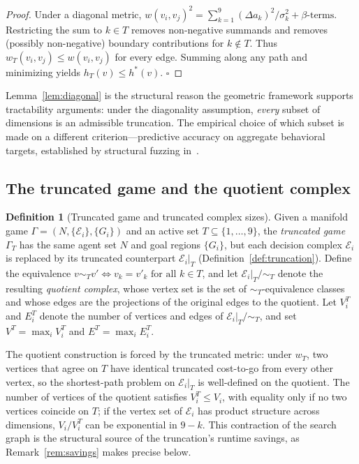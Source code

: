 \documentclass[11pt]{article}
\theoremstyle{definition}
\newtheorem{definition}[theorem]{Definition}
\theoremstyle{remark}
\newcommand{\E}{\mathcal{E}}
\begin{document}
\begin{proof}
Under a diagonal metric, $w(v_i, v_j)^2 = \sum_{k=1}^{9} (\Delta a_k)^2/\sigma_k^2 + \beta\text{-terms}$.
Restricting the sum to $k \in T$ removes non-negative summands and removes (possibly non-negative)
boundary contributions for $k \notin T$. Thus $w_T(v_i, v_j) \leq w(v_i, v_j)$ for every edge.
Summing along any path and minimizing yields $h_T(v) \leq h^*(v)$. $\square$
\end{proof}

Lemma~\ref{lem:diagonal} is the structural reason the geometric framework supports tractability
arguments: under the diagonality assumption, \emph{every} subset of dimensions is an admissible
truncation. The empirical choice of which subset is made on a different criterion---predictive
accuracy on aggregate behavioral targets, established by structural fuzzing in~\cite{bond2026tcss}.

\subsection{The truncated game and the quotient complex}

\begin{definition}[Truncated game and truncated complex sizes]
\label{def:truncated-game}
Given a manifold game $\Gamma = (N, \{\E_i\}, \{G_i\})$ and an active set $T \subseteq \{1,\ldots,9\}$,
the \emph{truncated game} $\Gamma_T$ has the same agent set $N$ and goal regions $\{G_i\}$, but each
decision complex $\E_i$ is replaced by its truncated counterpart $\E_i|_T$ (Definition~\ref{def:truncation}).
Define the equivalence $v \sim_T v' \iff v_k = v'_k \text{ for all } k \in T$, and let
$\E_i|_T / \sim_T$ denote the resulting \emph{quotient complex}, whose vertex set is the set of
$\sim_T$-equivalence classes and whose edges are the projections of the original edges to the quotient.
Let $V_i^T$ and $E_i^T$ denote the number of vertices and edges of $\E_i|_T / \sim_T$, and set
$V^T = \max_i V_i^T$ and $E^T = \max_i E_i^T$.
\end{definition}

The quotient construction is forced by the truncated metric: under $w_T$, two vertices that agree on
$T$ have identical truncated cost-to-go from every other vertex, so the shortest-path problem on
$\E_i|_T$ is well-defined on the quotient. The number of vertices of the quotient satisfies $V_i^T
\leq V_i$, with equality only if no two vertices coincide on $T$; if the vertex set of $\E_i$ has
product structure across dimensions, $V_i / V_i^T$ can be exponential in $9 - k$. This contraction
of the search graph is the structural source of the truncation's runtime savings, as
Remark~\ref{rem:savings} makes precise below.
\end{document}
